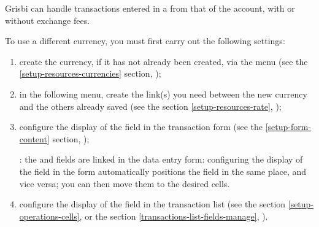 Grisbi can handle transactions entered in a  from that of the account, with or without exchange fees.

To use a different currency, you must first carry out the following settings:
\begin{enumerate}
	\item create the currency, if it has not already been created, via the  menu (see the \vref{setup-resources-currencies} section, );
	\item in the following menu, create the link(s) you need between the new currency and the others already saved (see the section \vref{setup-resources-rate}, );
	\item configure the display of the  field in the transaction form (see the \vref{setup-form-content} section, );
	 
	\Note{}: the  and  fields are linked in the data entry form: configuring the display of the  field in the form automatically positions the  field in the same place, and vice versa; you can then move them to the desired cells.
	\item configure the display of the  field in the transaction list (see the section \vref{setup-operations-cells},  or the section \vref{transactions-list-fields-manage}, ).
\end{enumerate}

